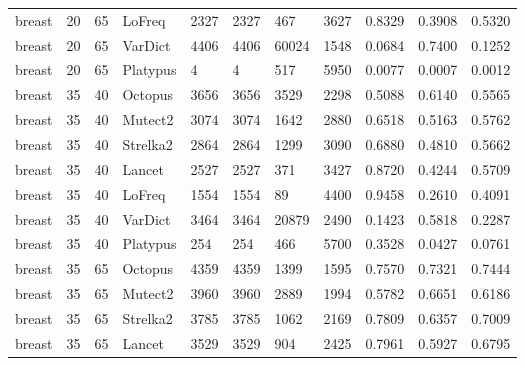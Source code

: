 \documentclass{article}
\begin{document}
\begin{table}[ht!]
{\begin{tabular}{lrrllllllll}
 breast &            20 &            65 &    LoFreq &              2327 &          2327 &       467 &      3627 &    0.8329 &      0.3908 &    0.5320 \\
 breast &            20 &            65 &   VarDict &              4406 &          4406 &     60024 &      1548 &    0.0684 &      0.7400 &    0.1252 \\
 breast &            20 &            65 &  Platypus &                 4 &             4 &       517 &      5950 &    0.0077 &      0.0007 &    0.0012 \\
 breast &            35 &            40 &   Octopus &              3656 &          3656 &      3529 &      2298 &    0.5088 &      0.6140 &    0.5565 \\
 breast &            35 &            40 &   Mutect2 &              3074 &          3074 &      1642 &      2880 &    0.6518 &      0.5163 &    0.5762 \\
 breast &            35 &            40 &  Strelka2 &              2864 &          2864 &      1299 &      3090 &    0.6880 &      0.4810 &    0.5662 \\
 breast &            35 &            40 &    Lancet &              2527 &          2527 &       371 &      3427 &    0.8720 &      0.4244 &    0.5709 \\
 breast &            35 &            40 &    LoFreq &              1554 &          1554 &        89 &      4400 &    0.9458 &      0.2610 &    0.4091 \\
 breast &            35 &            40 &   VarDict &              3464 &          3464 &     20879 &      2490 &    0.1423 &      0.5818 &    0.2287 \\
 breast &            35 &            40 &  Platypus &               254 &           254 &       466 &      5700 &    0.3528 &      0.0427 &    0.0761 \\
 breast &            35 &            65 &   Octopus &              4359 &          4359 &      1399 &      1595 &    0.7570 &      0.7321 &    0.7444 \\
 breast &            35 &            65 &   Mutect2 &              3960 &          3960 &      2889 &      1994 &    0.5782 &      0.6651 &    0.6186 \\
 breast &            35 &            65 &  Strelka2 &              3785 &          3785 &      1062 &      2169 &    0.7809 &      0.6357 &    0.7009 \\
 breast &            35 &            65 &    Lancet &              3529 &          3529 &       904 &      2425 &    0.7961 &      0.5927 &    0.6795 \\

\end{tabular}}
\end{table}
\end{document}
